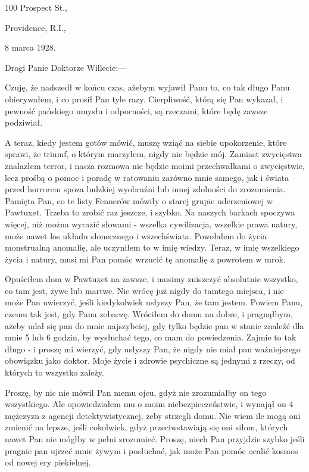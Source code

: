 \begin{displayquote}

\begin{flushright}
100 Prospect St.,

Providence, R.I.,

8 marca 1928.
\end{flushright}

Drogi Panie Doktorze Willecie:—

Czuję, że nadszedł w końcu czas, ażebym wyjawił Panu to, co tak długo Panu obiecywałem, i co prosił Pan tyle razy. Cierpliwość, którą się Pan wykazał, i pewność pańskiego umysłu i odporności, są rzeczami, które będę zawsze podziwiał. 

A teraz, kiedy jestem gotów mówić, muszę wziąć na siebie upokorzenie, które sprawi, że triumf, o którym marzyłem, nigdy nie będzie mój. Zamiast zwycięstwa znalazłem terror, i nasza rozmowa nie będzie moimi przechwałkami o zwycięstwie, lecz prośbą o pomoc i poradę w ratowaniu zarówno mnie samego, jak i świata przed horrorem spoza ludzkiej wyobraźni lub innej zdolności do zrozumienia. Pamięta Pan, co te listy Fennerów mówiły o starej grupie uderzeniowej w Pawtuxet. Trzeba to zrobić raz jeszcze, i szybko. Na naszych barkach spoczywa więcej, niż można wyrazić słowami - wszelka cywilizacja, wszelkie prawa natury, może nawet los układu słonecznego i wszechświata. Powołałem do życia monstrualną anomalię, ale uczyniłem to w imię wiedzy. Teraz, w imię wszelkiego życia i natury, musi mi Pan pomóc wrzucić tę anomalię z powrotem w mrok. 

Opuściłem dom w Pawtuxet na zawsze, i musimy zniszczyć absolutnie wszystko, co tam jest, żywe lub martwe. Nie wrócę już nigdy do tamtego miejsca, i nie może Pan uwierzyć, jeśli kiedykolwiek usłyszy Pan, że tam jestem. Powiem Panu, czemu tak jest, gdy Pana zobaczę. Wróciłem do domu na dobre, i pragnąłbym, ażeby udał się pan do mnie najszybciej, gdy tylko będzie pan w stanie znaleźć dla mnie 5 lub 6 godzin, by wysłuchać tego, co mam do powiedzenia. Zajmie to tak długo - i proszę mi wierzyć, gdy usłyszy Pan, że nigdy nie miał pan ważniejszego obowiązku jako doktor. Moje życie i zdrowie psychiczne są jednymi z rzeczy, od których to wszystko zależy.

Proszę, by nic nie mówił Pan memu ojcu, gdyż nie zrozumiałby on tego wszystkiego. Ale opowiedziałem mu o moim niebezpieczeństwie, i wynajął on 4 mężczyzn z agencji detektywistycznej, żeby strzegli domu. Nie wiem ile mogą oni zmienić na lepsze, jeśli cokolwiek, gdyż przeciwstawiają się oni siłom, których nawet Pan nie mógłby w pełni zrozumieć. Proszę, niech Pan przyjdzie szybko jeśli pragnie pan ujrzeć mnie żywym i posłuchać, jak może Pan pomóc ocalić kosmos od nowej ery piekielnej.


\end{displayquote}
